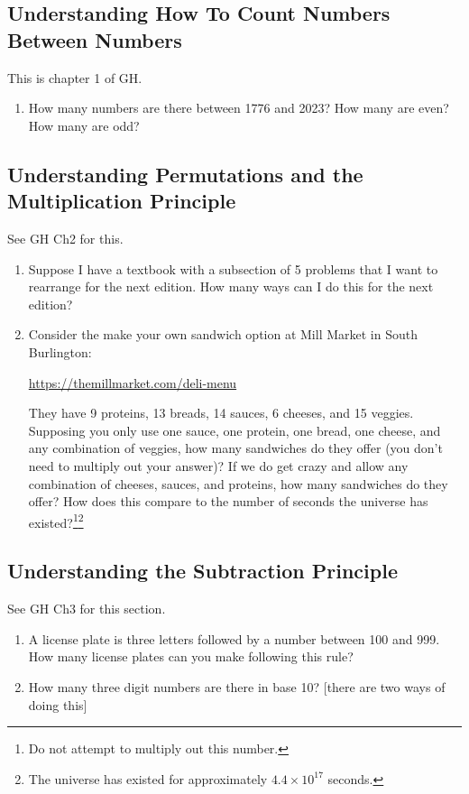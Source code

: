 \documentclass[11pt, letterpaper]{article}
\begin{document}
\subsection{Understanding How To Count Numbers Between Numbers}
This is chapter 1 of GH. 
\begin{enumerate}
	\item How many numbers are there between 1776 and 2023? How many are even? How many are odd?  
\end{enumerate} 
\subsection{Understanding Permutations and the Multiplication Principle}
See GH Ch2 for this. 
\begin{enumerate}
	\item Suppose I have a textbook with a subsection of 5 problems that I want to rearrange for the next edition. How many ways can I do this for the next edition?
	\item Consider the make your own sandwich option at Mill Market in South Burlington: \begin{center}
		\url{https://themillmarket.com/deli-menu}
	\end{center}
    They have 9 proteins, 13 breads, 14 sauces, 6 cheeses, and 15 veggies. 
    Supposing you only use one sauce, one protein, one bread, one cheese, and any combination of veggies, how many sandwiches do they offer (you don't need to multiply out your answer)?
    If we do get crazy and allow any combination of cheeses, sauces, and proteins, how many sandwiches do they offer? How does this compare to the number of seconds the universe has existed?\footnote{Do not attempt to multiply out this number.}\footnote{The universe has existed for approximately $4.4\times 10^{17}$ seconds.}
\end{enumerate}
\subsection{Understanding the Subtraction Principle}
See GH Ch3 for this section.
\begin{enumerate}
	\item A license plate is three letters followed by a number between 100 and 999. How many license plates can you make following this rule? 
	\item 	How many three digit numbers are there in base 10? [there are two ways of doing this]
\end{enumerate}
\end{document}
